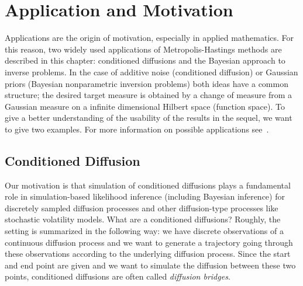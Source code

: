 \chapter{Application and Motivation}
\label{Application}


Applications are the origin of motivation, especially in applied mathematics. For this reason, two widely used applications of Metropolis-Hastings methods are described in this chapter: conditioned diffusions and the Bayesian approach to inverse problems. In the case of additive noise (conditioned diffusion) or Gaussian priors (Bayesian nonparametric inversion problems) both ideas have a common structure; the desired target measure is obtained by a change of measure from a Gaussian measure on a infinite dimensional Hilbert space (function space). To give a better understanding of the usability of the results in the sequel, we want to give two examples. For more information on possible applications see~\autocite{Beskos2009, Beskos2008, Dashti2012, Dashti2013, Delyon2006, Hairer2011, Stuart2010}.

\section{Conditioned Diffusion}

Our motivation is that simulation of conditioned diffusions plays a fundamental role in simulation-based likelihood inference (including Bayesian inference) for discretely sampled diffusion processes and other diffusion-type processes like stochastic volatility models. What are a conditioned diffusions?  Roughly, the setting is summarized in the following way: we have discrete observations of a continuous diffusion process and we want to generate a trajectory going through these observations according to the underlying diffusion process. Since the start and end point are given and we want to simulate the diffusion between these two points, conditioned diffusions are often called \textit{diffusion bridges}.

